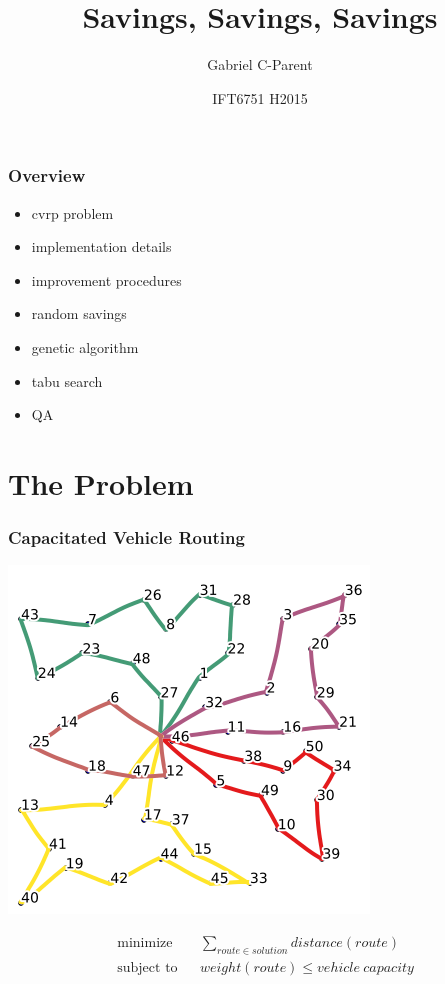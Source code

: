 \documentclass{beamer}
\title{Savings, Savings, Savings}
\author{Gabriel C-Parent}
\date{IFT6751 H2015}
\begin{document}
\maketitle

\begin{frame}
\frametitle{Overview}
\begin{itemize}
	\item cvrp problem
	\item implementation details
	\item improvement procedures
	\item random savings
	\item genetic algorithm
	\item tabu search
	\item QA
\end{itemize}
\end{frame}


\section{The Problem}

\begin{frame}
\frametitle{Capacitated Vehicle Routing}
\begin{center}

\includegraphics[scale=0.25]{figs/cvrp}


\begin{equation*}
\begin{aligned}
& \text{minimize}
& & \sum\limits_{route \in solution} distance(route) \\
& \text{subject to}
& & weight(route) \leq vehicle\ capacity
\end{aligned}
\end{equation*}

\end{center}
\end{frame}
\end{document}
